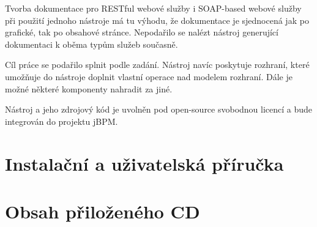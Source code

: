 \documentclass[11pt,twoside,a4paper]{book}
\begin{document}
Tvorba dokumentace pro RESTful webové služby i SOAP-based webové služby při
použití jednoho nástroje má tu výhodu, že dokumentace je sjednocená jak po
grafické, tak po obsahové stránce.
Nepodařilo se nalézt nástroj generující dokumentaci k oběma typům služeb
současně.

Cíl práce se podařilo splnit podle zadání. Nástroj navíc poskytuje rozhraní,
které umožňuje do nástroje doplnit vlastní operace nad modelem rozhraní. Dále je
možné některé komponenty nahradit za jiné.

Nástroj a jeho zdrojový kód je uvolněn pod open-source svobodnou licencí a bude
integrován do projektu jBPM.


 
 

%

\appendix



\chapter{Instalační a uživatelská příručka} 

\chapter{Obsah přiloženého CD}
\end{document}
